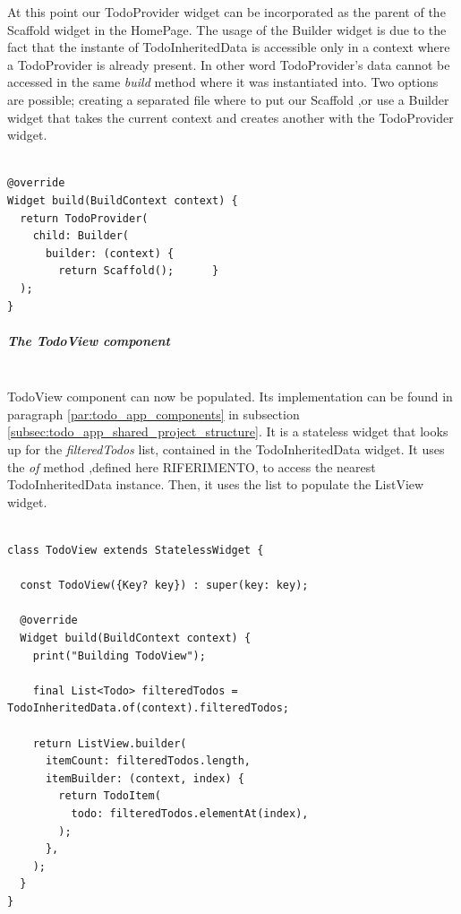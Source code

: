 At this point our TodoProvider widget can be incorporated as the parent of the Scaffold widget in the HomePage. The usage of the Builder widget is due to the fact that the instante of TodoInheritedData is accessible only in a context where a TodoProvider is already present. In other word TodoProvider’s data cannot be accessed in the same \textit{build } method where it was instantiated into. Two options are possible; creating a separated file where to put our Scaffold ,or use a Builder widget that takes the current context and creates another with the TodoProvider widget.
\mbox{}\\
\begin{code}

 \mbox{}

\label{code:2.20}
\begin{verbatim}

@override
Widget build(BuildContext context) {
  return TodoProvider(
    child: Builder(
      builder: (context) {
        return Scaffold();      }
  );
}
\end{verbatim}
\end{code}
\subparagraph{The TodoView component}\mbox{}\\
\label{subpar:todo_app_inherited_widget_todoview_component}
TodoView component can now be populated. Its implementation can be found in paragraph \ref{par:todo_app_components} in subsection \ref{subsec:todo_app_shared_project_structure}. It is a stateless widget that looks up for the \textit{filteredTodos} list, contained in the TodoInheritedData widget. It uses the \textit{of} method ,defined here RIFERIMENTO, to access the nearest TodoInheritedData instance. Then, it uses the list to populate the ListView widget. 
\mbox{}\\

\begin{code}
 \mbox{}

\label{code:2.21}
\begin{verbatim}

class TodoView extends StatelessWidget {

  const TodoView({Key? key}) : super(key: key);

  @override
  Widget build(BuildContext context) {
    print("Building TodoView");

    final List<Todo> filteredTodos = TodoInheritedData.of(context).filteredTodos;

    return ListView.builder(
      itemCount: filteredTodos.length,
      itemBuilder: (context, index) {
        return TodoItem(
          todo: filteredTodos.elementAt(index),
        );
      },
    );
  }
}
\end{verbatim}
\end{code}

